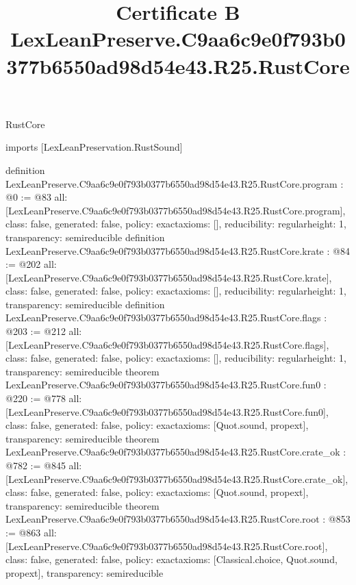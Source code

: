 \begin{lexlean}{RustCore}
\title{Certificate B LexLeanPreserve.C9aa6c9e0f793b0377b6550ad98d54e43.R25.RustCore}
\begin{coremodule}
imports [LexLeanPreservation.RustSound]

definition LexLeanPreserve.C9aa6c9e0f793b0377b6550ad98d54e43.R25.RustCore.program : @0 := @83 {
  all: [LexLeanPreserve.C9aa6c9e0f793b0377b6550ad98d54e43.R25.RustCore.program],
  class: false,
  generated: false,
  policy: exact{axioms: []},
  reducibility: regular{height: 1},
  transparency: semireducible
}
definition LexLeanPreserve.C9aa6c9e0f793b0377b6550ad98d54e43.R25.RustCore.krate : @84 := @202 {
  all: [LexLeanPreserve.C9aa6c9e0f793b0377b6550ad98d54e43.R25.RustCore.krate],
  class: false,
  generated: false,
  policy: exact{axioms: []},
  reducibility: regular{height: 1},
  transparency: semireducible
}
definition LexLeanPreserve.C9aa6c9e0f793b0377b6550ad98d54e43.R25.RustCore.flags : @203 := @212 {
  all: [LexLeanPreserve.C9aa6c9e0f793b0377b6550ad98d54e43.R25.RustCore.flags],
  class: false,
  generated: false,
  policy: exact{axioms: []},
  reducibility: regular{height: 1},
  transparency: semireducible
}
theorem LexLeanPreserve.C9aa6c9e0f793b0377b6550ad98d54e43.R25.RustCore.fun0 : @220 := @778 {
  all: [LexLeanPreserve.C9aa6c9e0f793b0377b6550ad98d54e43.R25.RustCore.fun0],
  class: false,
  generated: false,
  policy: exact{axioms: [Quot.sound, propext]},
  transparency: semireducible
}
theorem LexLeanPreserve.C9aa6c9e0f793b0377b6550ad98d54e43.R25.RustCore.crate_ok : @782 := @845 {
  all: [LexLeanPreserve.C9aa6c9e0f793b0377b6550ad98d54e43.R25.RustCore.crate_ok],
  class: false,
  generated: false,
  policy: exact{axioms: [Quot.sound, propext]},
  transparency: semireducible
}
theorem LexLeanPreserve.C9aa6c9e0f793b0377b6550ad98d54e43.R25.RustCore.root : @853 := @863 {
  all: [LexLeanPreserve.C9aa6c9e0f793b0377b6550ad98d54e43.R25.RustCore.root],
  class: false,
  generated: false,
  policy: exact{axioms: [Classical.choice, Quot.sound, propext]},
  transparency: semireducible
}


\end{coremodule}
\end{lexlean}
